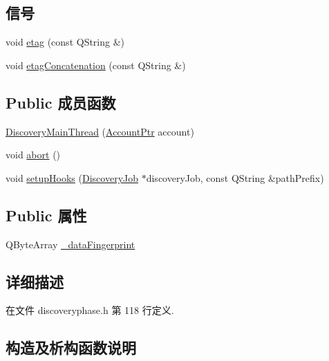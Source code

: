 \subsection*{信号}
\begin{DoxyCompactItemize}
\item 
void \hyperlink{class_o_c_c_1_1_discovery_main_thread_a2665c23d76962bed80458d0f564399e2}{etag} (const Q\+String \&)
\item 
void \hyperlink{class_o_c_c_1_1_discovery_main_thread_a49d9caf20edf9466c923ebabc21f6e77}{etag\+Concatenation} (const Q\+String \&)
\end{DoxyCompactItemize}
\subsection*{Public 成员函数}
\begin{DoxyCompactItemize}
\item 
\hyperlink{class_o_c_c_1_1_discovery_main_thread_a4b765cc51635c4445405cb78f083a0cd}{Discovery\+Main\+Thread} (\hyperlink{namespace_o_c_c_a848616aedb9188e223c6b9867757fe69}{Account\+Ptr} account)
\item 
void \hyperlink{class_o_c_c_1_1_discovery_main_thread_a5961ddefb43c64c7c90e896eb9ee6860}{abort} ()
\item 
void \hyperlink{class_o_c_c_1_1_discovery_main_thread_a3376415f6029953ceb4c4c6259f92274}{setup\+Hooks} (\hyperlink{class_o_c_c_1_1_discovery_job}{Discovery\+Job} $\ast$discovery\+Job, const Q\+String \&path\+Prefix)
\end{DoxyCompactItemize}
\subsection*{Public 属性}
\begin{DoxyCompactItemize}
\item 
Q\+Byte\+Array \hyperlink{class_o_c_c_1_1_discovery_main_thread_aabefda399cf316388f8f6c702f073d59}{\+\_\+data\+Fingerprint}
\end{DoxyCompactItemize}


\subsection{详细描述}


在文件 discoveryphase.\+h 第 118 行定义.



\subsection{构造及析构函数说明}
\mbox{\label{class_o_c_c_1_1_discovery_main_thread_a4b765cc51635c4445405cb78f083a0cd}} 

